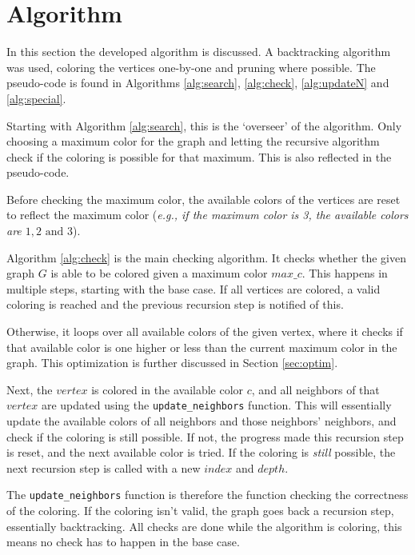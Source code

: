 \documentclass{article}
\begin{document}
\section{Algorithm}
\label{sec:alg}

In this section the developed algorithm is discussed. A backtracking algorithm was used, coloring the vertices one-by-one and pruning where possible. The pseudo-code is found in Algorithms \ref{alg:search}, \ref{alg:check}, \ref{alg:updateN} and \ref{alg:special}. 


Starting with Algorithm \ref{alg:search}, this is the `overseer' of the algorithm. Only choosing a maximum color for the graph and letting the recursive algorithm check if the coloring is possible for that maximum.
This is also reflected in the pseudo-code. 

Before checking the maximum color, the available colors of the vertices are reset to reflect the maximum color (\textit{e.g., if the maximum color is 3, the available colors are ${1, 2 \text{ and } 3}$}).

Algorithm \ref{alg:check} is the main checking algorithm. It checks whether the given graph $G$ is able to be colored given a maximum color $max\_c$. This happens in multiple steps, starting with the base case. If all vertices are colored, a valid coloring is reached and the previous recursion step is notified of this. 

Otherwise, it loops over all available colors of the given vertex, where it checks if that available color is one higher or less than the current maximum color in the graph. This optimization is further discussed in Section \ref{sec:optim}.

Next, the $vertex$ is colored in the available color $c$, and all neighbors of that $vertex$ are updated using the \texttt{update\_neighbors} function. This will essentially update the available colors of all neighbors and those neighbors' neighbors, and check if the coloring is still possible. If not, the progress made this recursion step is reset, and the next available color is tried. If the coloring is \textit{still} possible, the next recursion step is called with a new $index$ and $depth$. 

The \texttt{update\_neighbors} function is therefore the function checking the correctness of the coloring. If the coloring isn't valid, the graph goes back a recursion step, essentially backtracking. All checks are done while the algorithm is coloring, this means no check has to happen in the base case.
\end{document}
